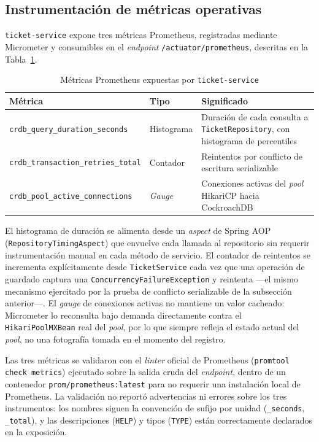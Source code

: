 \subsection{Instrumentación de métricas operativas}

\texttt{ticket-service} expone tres métricas Prometheus, registradas mediante Micrometer y
consumibles en el \emph{endpoint} \texttt{/actuator/prometheus}, descritas en la
Tabla~\ref{tab:metricas}.

\begin{table}[H]
\centering
\caption{Métricas Prometheus expuestas por \texttt{ticket-service}}
\label{tab:metricas}
\begin{tabular}{@{}p{4.3cm}p{1.8cm}p{6.7cm}@{}}
\toprule
\textbf{Métrica} & \textbf{Tipo} & \textbf{Significado} \\
\midrule
\texttt{crdb\_query\_duration\_seconds} & Histograma & Duración de cada consulta a \texttt{TicketRepository}, con histograma de percentiles \\
\texttt{crdb\_transaction\_retries\_total} & Contador & Reintentos por conflicto de escritura serializable \\
\texttt{crdb\_pool\_active\_connections} & \emph{Gauge} & Conexiones activas del \emph{pool} HikariCP hacia CockroachDB \\
\bottomrule
\end{tabular}
\end{table}

El histograma de duración se alimenta desde un \emph{aspect} de Spring AOP
(\texttt{RepositoryTimingAspect}) que envuelve cada llamada al repositorio sin requerir
instrumentación manual en cada método de servicio. El contador de reintentos se incrementa
explícitamente desde \texttt{TicketService} cada vez que una operación de guardado captura una
\texttt{ConcurrencyFailureException} y reintenta —el mismo mecanismo ejercitado por la prueba de
conflicto serializable de la subsección anterior—. El \emph{gauge} de conexiones activas no
mantiene un valor cacheado: Micrometer lo reconsulta bajo demanda directamente contra el
\texttt{HikariPoolMXBean} real del \emph{pool}, por lo que siempre refleja el estado actual del
\emph{pool}, no una fotografía tomada en el momento del registro.

Las tres métricas se validaron con el \emph{linter} oficial de Prometheus (\texttt{promtool check
metrics}) ejecutado sobre la salida cruda del \emph{endpoint}, dentro de un contenedor
\texttt{prom/prometheus:latest} para no requerir una instalación local de Prometheus. La
validación no reportó advertencias ni errores sobre los tres instrumentos: los nombres siguen la
convención de sufijo por unidad (\texttt{\_seconds}, \texttt{\_total}), y las descripciones
(\texttt{HELP}) y tipos (\texttt{TYPE}) están correctamente declarados en la exposición.

